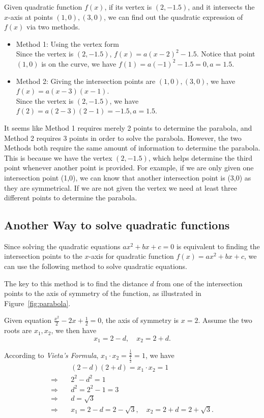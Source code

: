 \documentclass[11pt, oneside]{article}   	%
\begin{document}
Given quadratic function $f(x)$, if its vertex is $(2,-1.5)$, and it intersects the $x$-axis at points $(1,0), (3,0)$, 
we can find out the quadratic expression of $f(x)$ via two methods.

\begin{itemize}
\item Method 1: Using the vertex form \\
Since the vertex is $(2,-1.5)$, $f(x)=a(x-2)^2-1.5$. Notice that point $(1,0)$ is on the curve, we have $f(1)=a(-1)^2-1.5 = 0, a=1.5$.
\item Method 2: Giving the intersection points are $(1,0), (3,0)$, we have $f(x)=a(x-3)(x-1)$.\\ Since the vertex is $(2,-1.5)$, we have $f(2)=a(2-3)(2-1)=-1.5, a =1.5$.
\end{itemize}
It seems like Method 1 requires merely 2 points to determine the parabola, and Method 2 requires 3 points in order to solve the parabola. However, the two Methods both require the same amount of information to determine the parabola. This is because we have the vertex $(2,-1.5)$, which helps determine the third point whenever another point is provided. For example, if we are only given one intersection point (1,0), we can know that another intersection point is (3,0) as they are symmetrical. If we are not given the vertex we need at least three different points to determine the parabola.

\subsection{Another Way to solve quadratic functions}
Since solving the quadratic equations $ax^2+bx+c=0$ is equivalent to finding the intersection points to the $x$-axis for quadratic function $f(x)=ax^2+bx+c$, we can use the following method to solve quadratic equations.


The key to this method is to find  the distance $d$ from one of the intersection points to the axis of symmetry of the function, as illustrated in Figure~\ref{fig:parabola}.

Given equation $\frac{x^2}{2}-2x+\frac{1}{2}=0$, the axis of symmetry is $x=2$. Assume the two roots are $x_1, x_2$, we then have \[x_1=2-d, \quad x_2= 2+d.\]

According to \emph{Vieta's Formula}, $x_1 \cdot x_2= \frac{\frac{1}{2}}{\frac{1}{2}}=1$, we have 
\begin{align*}
&(2-d)(2+d)=x_1 \cdot x_2 =1\\
\Rightarrow\quad&2^2-d^2=1\\
\Rightarrow\quad&d^2=2^2-1=3\\
\Rightarrow\quad&d=\sqrt{3}\\
\Rightarrow\quad&x_1=2-d=2-\sqrt{3},\quad x_2=2+d=2+\sqrt{3}.
\end{align*}
\end{document}
